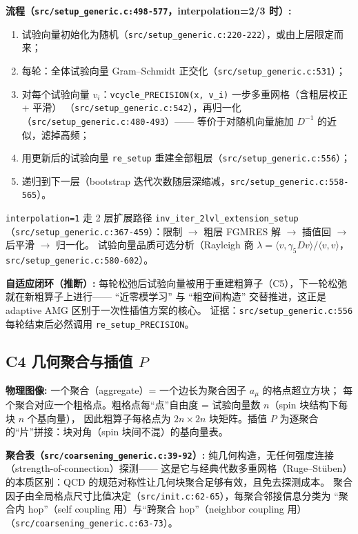 \documentclass[UTF8]{ctexart}
\begin{document}
\textbf{流程（\texttt{\nolinkurl{src/setup_generic.c:498-577}}，interpolation=2/3 时）:}
\begin{enumerate}
\item 试验向量初始化为随机（\texttt{\nolinkurl{src/setup_generic.c:220-222}}），或由上层限定而来；
\item 每轮：全体试验向量 Gram--Schmidt 正交化（\texttt{\nolinkurl{src/setup_generic.c:531}}）；
\item 对每个试验向量 $v_i$：\texttt{vcycle\_PRECISION(x, v\_i)} 一步多重网格（含粗层校正 + 平滑）
      （\texttt{\nolinkurl{src/setup_generic.c:542}}），再归一化（\texttt{\nolinkurl{src/setup_generic.c:480-493}}）——
      等价于对随机向量施加 $D^{-1}$ 的近似，滤掉高频；
\item 用更新后的试验向量 \texttt{re\_setup} 重建全部粗层（\texttt{\nolinkurl{src/setup_generic.c:556}}）；
\item 递归到下一层（bootstrap 迭代次数随层深缩减，\texttt{\nolinkurl{src/setup_generic.c:558-565}}）。
\end{enumerate}
\texttt{interpolation=1} 走 2 层扩展路径 \texttt{inv\_iter\_2lvl\_extension\_setup}
（\texttt{\nolinkurl{src/setup_generic.c:367-459}}）：限制 $\to$ 粗层 FGMRES 解 $\to$ 插值回 $\to$ 后平滑 $\to$ 归一化。
试验向量品质可选分析（Rayleigh 商 $\lambda=\langle v, \gamma_5 D v\rangle/\langle v,v\rangle$，
\texttt{\nolinkurl{src/setup_generic.c:580-602}}）。

\begin{keybox}
\textbf{自适应闭环（推断）:} 每轮松弛后试验向量被用于重建粗算子（C5），下一轮松弛就在新粗算子上进行——
``近零模学习'' 与 ``粗空间构造'' 交替推进，这正是 adaptive AMG 区别于一次性插值方案的核心。
证据：\texttt{\nolinkurl{src/setup_generic.c:556}} 每轮结束后必然调用 \texttt{re\_setup\_PRECISION}。
\end{keybox}

\subsection{C4 几何聚合与插值 $P$}
\begin{physbox}
\textbf{物理图像:} 一个聚合（aggregate）= 一个边长为聚合因子 $a_\mu$ 的格点超立方块；
每个聚合对应一个粗格点。粗格点每``点''自由度 = 试验向量数 $n$（spin 块结构下每块 $n$ 个基向量），
因此粗算子每格点为 $2n\times 2n$ 块矩阵。插值 $P$ 为逐聚合的``片''拼接：块对角（spin 块间不混）的基向量表。
\end{physbox}

\textbf{聚合表（\texttt{\nolinkurl{src/coarsening_generic.c:39-92}}）:} 纯几何构造，无任何强度连接（strength-of-connection）探测——
这是它与经典代数多重网格（Ruge--Stüben）的本质区别：QCD 的规范对称性让几何块聚合足够有效，且免去探测成本。
聚合因子由全局格点尺寸比值决定（\texttt{\nolinkurl{src/init.c:62-65}}），每聚合邻接信息分类为
``聚合内 hop''（self coupling 用）与``跨聚合 hop''（neighbor coupling 用）（\texttt{\nolinkurl{src/coarsening_generic.c:63-73}}）。
\end{document}
